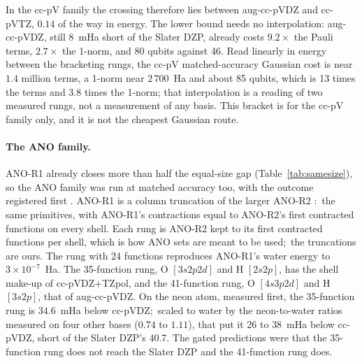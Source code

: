 \documentclass[aps,pra,twocolumn,superscriptaddress,longbibliography]{revtex4-2}
\newcommand{\gvq}[2]{#2}
\begin{document}
In the cc-pV family the crossing therefore lies between aug-cc-pVDZ and cc-pVTZ, $0.14$ of
the way in energy.  The lower bound needs no interpolation: aug-cc-pVDZ,
still $8$~mHa short of the Slater DZP, already costs
$\gvq{p62_aug_pauli_ratio}{9.2}\times$ the Pauli terms,
$\gvq{p62_aug_lambda_ratio}{2.7}\times$ the 1-norm, and 80 qubits
against 46.  Read linearly in energy between the bracketing rungs, the
cc-pV matched-accuracy Gaussian cost is near $1.4$ million terms, a 1-norm
near $2\,700$~Ha and about 85 qubits, which is 13 times the terms and
3.8 times the 1-norm; that interpolation is a reading of two measured
rungs, not a measurement of any basis.  This bracket is for the cc-pV
family only, and it is not the cheapest Gaussian route.

\paragraph*{The ANO family.}  ANO-R1 already closes more than half the
equal-size gap (Table~\ref{tab:samesize}), so the ANO family was run at
matched accuracy too, with the outcome registered first
\cite{am_record}.  ANO-R1 is a column truncation of the larger ANO-R2
\cite{zobel2020}:\ the same primitives, with ANO-R1's contractions equal
to ANO-R2's first contracted functions on every shell.  Each rung is
ANO-R2 kept to its first contracted functions per shell, which is how
ANO sets are meant to be used;\ the truncations are ours.  The rung with
24 functions reproduces ANO-R1's water energy to $3\times10^{-7}$~Ha.
The 35-function rung, O $[3s2p2d]$ and H $[2s2p]$, has the shell
make-up of cc-pVDZ+TZpol, and the 41-function rung, O $[4s3p2d]$ and H
$[3s2p]$, that of aug-cc-pVDZ.  On the neon atom, measured first, the
35-function rung is $34.6$~mHa below cc-pVDZ;\ scaled to water by the
neon-to-water ratios measured on four other bases ($0.74$ to $1.11$),
that put it $26$ to $38$~mHa below cc-pVDZ, short of the Slater DZP's
$40.7$.  The gated predictions were that the 35-function rung does not
reach the Slater DZP and the 41-function rung does.
\end{document}
